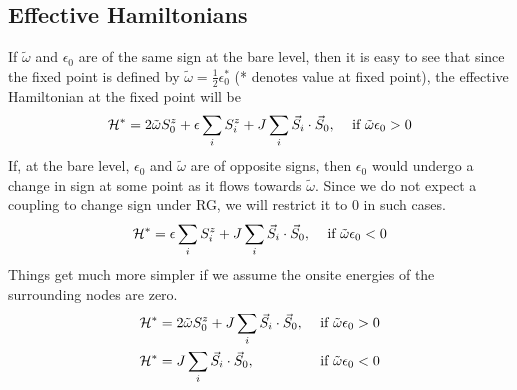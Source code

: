 \documentclass[12pt,twoside]{article}
\numberwithin{equation}{section}
\begin{document}
\subsection{Effective Hamiltonians}
If \(\tilde\omega\) and \(\epsilon_0\) are of the same sign at the bare level, then it is easy to see that since the fixed point is defined by \(\tilde\omega = \frac{1}{2}\epsilon_0^*\) (* denotes value at fixed point), the effective Hamiltonian at the fixed point will be
\begin{equation}\begin{aligned}
	\mathcal{H}^* = 2\tilde\omega S_0^z +  \epsilon \sum_i S_i^z + J\sum_i \vec S_i \cdot \vec S_0, && \text{ if }\tilde\omega \epsilon_0 > 0
\end{aligned}\end{equation}
If, at the bare level, \(\epsilon_0\) and \(\tilde\omega\) are of opposite signs, then \(\epsilon_0\) would undergo a change in sign at some point as it flows towards \(\tilde \omega\). Since we do not expect a coupling to change sign under RG, we will restrict it to 0 in such cases.
\begin{equation}\begin{aligned}
	\mathcal{H}^* = \epsilon \sum_i S_i^z + J\sum_i \vec S_i \cdot \vec S_0, && \text{ if }\tilde\omega \epsilon_0 < 0
\end{aligned}\end{equation}
Things get much more simpler if we assume the onsite energies of the surrounding nodes are zero.
\begin{equation}\begin{aligned}
	\mathcal{H}^* &= 2\tilde\omega S_0^z + J\sum_i \vec S_i \cdot \vec S_0, && \text{ if }\tilde\omega \epsilon_0 > 0\\
	\mathcal{H}^* &= J\sum_i \vec S_i \cdot \vec S_0, && \text{ if }\tilde\omega \epsilon_0 < 0
\end{aligned}\end{equation}
\end{document}
